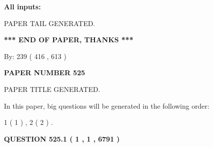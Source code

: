 \documentclass[12pt]{article}
\begin{document}
   
   
   
\noindent{}
   
   
   
   
\noindent\vspace{0.1in}\hspace{-0.08in} {\textbf{\Large{All inputs: }}}
   
   
   
   
   
   
 \vspace{0.2in}
 
   
   
\vspace{2.0in} PAPER TAIL GENERATED.
   
   
   
   
\vspace{1.0in} 
{\textbf{\large{ *** END OF PAPER, THANKS *** }}} 
   
   
\hspace{1.0in} By: 
 239 ( 416 ,  613 )
   
   
   
   
\newpage 
\setcounter{page}{ 
   525001 } 
   
   
   
   
 {\textbf{ \Large{ PAPER NUMBER  525  }}}
   
   
\vspace{0.2in}
   
   
   
   
   
   
   
   
 \vspace{0.2in}
 
 
 
 
   
   
 PAPER TITLE GENERATED.
   
   
   
\vspace{0.2in}
   
In this paper, big questions will be generated in the following order: 
   
   
   1 ( 1 )
 ,
   2 ( 2 )
 .
  
\vspace{0.2in}
  
{\textbf{\Large{QUESTION
525.1 
 ( 1 , 1 , 6791 )
}}}
  
\end{document}
